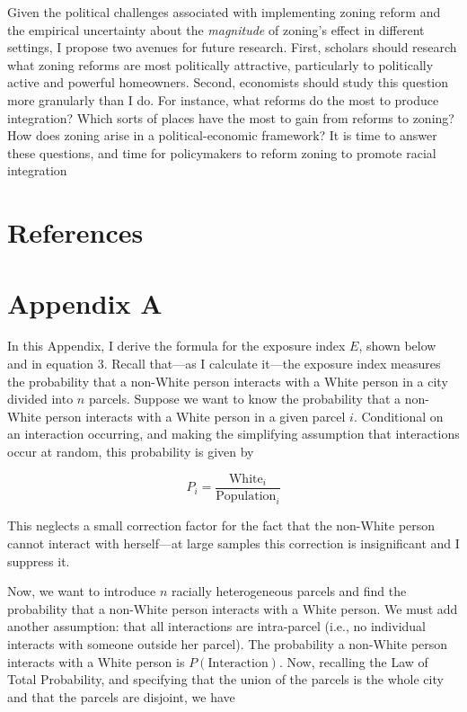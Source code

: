 \documentclass[11pt]{article}
\begin{document}
Given the political challenges associated with implementing zoning reform and the empirical uncertainty about the \textit{magnitude} of zoning's effect in different settings, I propose two avenues for future research. First, scholars should research what zoning reforms are most politically attractive, particularly to politically active and powerful homeowners. Second, economists should study this question more granularly than I do. For instance, what reforms do the most to produce integration? Which sorts of places have the most to gain from reforms to zoning? How does zoning arise in a political-economic framework? It is time to answer these questions, and time for policymakers to reform zoning to promote racial integration

\pagebreak
\section*{References}
\singlespacing
\begin{raggedright}
\nocite{*}
\printbibliography[heading=none]
\pagebreak

\end{raggedright}
\doublespacing
\section*{Appendix A}

In this Appendix, I derive the formula for the exposure index $E$, shown below and in equation 3. Recall that---as I calculate it---the exposure index measures the probability that a non-White person interacts with a White person in a city divided into $n$ parcels. Suppose we want to know the probability that a non-White person interacts with a White person in a given parcel $i$. Conditional on an interaction occurring, and making the simplifying assumption that interactions occur at random, this probability is given by 

\begin{equation*}
    P_i=\frac{\text{White}_i}{\text{Population}_i}
\end{equation*}

\noindent This neglects a small correction factor for the fact that the non-White person cannot interact with herself---at large samples this correction is insignificant and I suppress it.

Now, we want to introduce $n$ racially heterogeneous parcels and find the probability that a non-White person interacts with a White person. We must add another assumption: that all interactions are intra-parcel (i.e., no individual interacts with someone outside her parcel). The probability a non-White person interacts with a White person is $P(\text{Interaction})$. Now, recalling the Law of Total Probability, and specifying that the union of the parcels is the whole city and that the parcels are disjoint, we have
\end{document}
